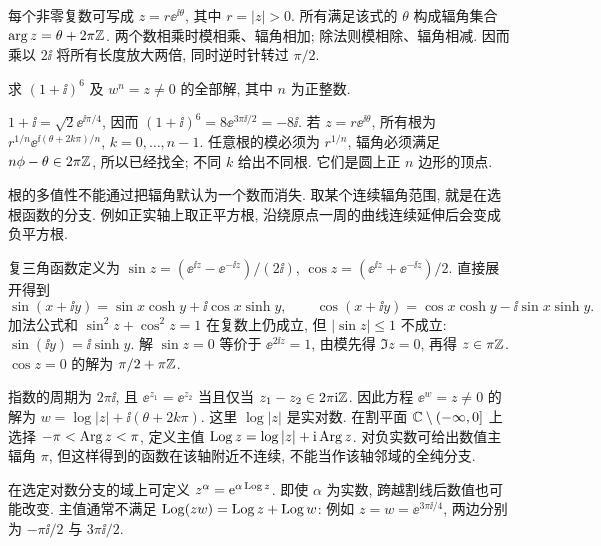 每个非零复数可写成 $z=r\ee^{\ii\theta}$, 其中 $r=|z|>0$. 所有满足该式的 $\theta$ 构成辐角集合 $\arg z=\theta+2\pi\mathbb Z$. 两个数相乘时模相乘、辐角相加; 除法则模相除、辐角相减. 因而乘以 $2\ii$ 将所有长度放大两倍, 同时逆时针转过 $\pi/2$.
\begin{center}
\end{center}
\begin{example}
求 $(1+\ii)^6$ 及 $w^n=z\ne0$ 的全部解, 其中 $n$ 为正整数.
\end{example}
\begin{solution}
$1+\ii=\sqrt2\ee^{\ii\pi/4}$, 因而 $(1+\ii)^6=8\ee^{3\pi\ii/2}=-8\ii$. 若 $z=r\ee^{\ii\theta}$, 所有根为 $r^{1/n}\ee^{\ii(\theta+2k\pi)/n}$, $k=0,\ldots,n-1$. 任意根的模必须为 $r^{1/n}$, 辐角必须满足 $n\phi-\theta\in2\pi\mathbb Z$, 所以已经找全; 不同 $k$ 给出不同根. 它们是圆上正 $n$ 边形的顶点.
\end{solution}
根的多值性不能通过把辐角默认为一个数而消失. 取某个连续辐角范围, 就是在选根函数的分支. 例如正实轴上取正平方根, 沿绕原点一周的曲线连续延伸后会变成负平方根.

复三角函数定义为 $\sin z=(\ee^{\ii z}-\ee^{-\ii z})/(2\ii)$, $\cos z=(\ee^{\ii z}+\ee^{-\ii z})/2$. 直接展开得到
\[
\sin(x+\ii y)=\sin x\cosh y+\ii\cos x\sinh y,\qquad
\cos(x+\ii y)=\cos x\cosh y-\ii\sin x\sinh y.
\]
加法公式和 $\sin^2z+\cos^2z=1$ 在复数上仍成立, 但 $|\sin z|\le1$ 不成立: $\sin(\ii y)=\ii\sinh y$. 解 $\sin z=0$ 等价于 $\ee^{2\ii z}=1$, 由模先得 $\Im z=0$, 再得 $z\in\pi\mathbb Z$. $\cos z=0$ 的解为 $\pi/2+\pi\mathbb Z$.

指数的周期为 $2\pi\ii$, 且 $\ee^{z_1}=\ee^{z_2}$ 当且仅当 $z_1-z_2\in2\pi\mathrm i\mathbb Z$. 因此方程 $\ee^w=z\ne0$ 的解为 $w=\log|z|+\ii(\theta+2k\pi)$. 这里 $\log|z|$ 是实对数. 在割平面 $\mathbb C\setminus(-\infty,0]$ 上选择 $-\pi<\operatorname{Arg} z<\pi$, 定义主值 $\operatorname{Log} z=\log|z|+\mathrm i\operatorname{Arg} z$. 对负实数可给出数值主辐角 $\pi$, 但这样得到的函数在该轴附近不连续, 不能当作该轴邻域的全纯分支.

在选定对数分支的域上可定义 $z^\alpha=\mathrm e^{\alpha\operatorname{Log} z}$. 即使 $\alpha$ 为实数, 跨越割线后数值也可能改变. 主值通常不满足 $\operatorname{Log}(zw)=\operatorname{Log} z+\operatorname{Log} w$: 例如 $z=w=\ee^{3\pi\ii/4}$, 两边分别为 $-\pi\ii/2$ 与 $3\pi\ii/2$.

